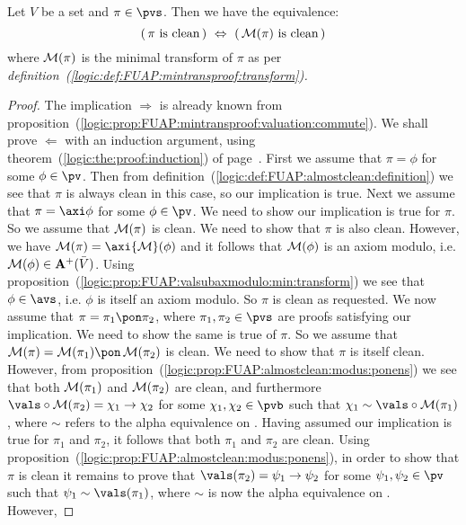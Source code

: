 \begin{prop}\label{logic:prop:FUAP:proofwithcleanMT:mintrans:clean:equivalence}
Let $V$ be a set and $\pi\in\pvs$. Then we have the equivalence:
    \[
    (\,\mbox{$\pi$ is clean}\,)\ \Leftrightarrow\ (\,\mbox{${\cal M}(\pi)$ is clean}\,)
    \]
where ${\cal M}(\pi)$ is the minimal transform of $\pi$ as per {\em
definition~(\ref{logic:def:FUAP:mintransproof:transform}).}
\end{prop}
\begin{proof}
The implication $\Rightarrow$ is already known from
proposition~(\ref{logic:prop:FUAP:mintransproof:valuation:commute}).
We shall prove $\Leftarrow$ with an induction argument, using
theorem~(\ref{logic:the:proof:induction}) of
page~\pageref{logic:the:proof:induction}. First we assume that
$\pi=\phi$ for some $\phi\in\pv$. Then from
definition~(\ref{logic:def:FUAP:almostclean:definition}) we see that
$\pi$ is always clean in this case, so our implication is true. Next
we assume that $\pi=\axi\phi$ for some $\phi\in\pv$. We need to show
our implication is true for $\pi$. So we assume that ${\cal M}(\pi)$
is clean. We need to show that $\pi$ is also clean. However, we have
${\cal M}(\pi)=\axi{\cal M}(\phi)$ and it follows that ${\cal
M}(\phi)$ is an axiom modulo, i.e. ${\cal M}(\phi)\in{\bf
A}^{+}(\bar{V})$. Using
proposition~(\ref{logic:prop:FUAP:valsubaxmodulo:min:transform}) we
see that $\phi\in\avs$, i.e. $\phi$ is itself an axiom modulo. So
$\pi$ is clean as requested. We now assume that
$\pi=\pi_{1}\pon\pi_{2}$, where $\pi_{1},\pi_{2}\in\pvs$ are proofs
satisfying our implication. We need to show the same is true of
$\pi$. So we assume that ${\cal M}(\pi)={\cal M}(\pi_{1})\pon\,{\cal
M}(\pi_{2})$ is clean. We need to show that $\pi$ is itself clean.
However, from
proposition~(\ref{logic:prop:FUAP:almostclean:modus:ponens}) we see
that both ${\cal M}(\pi_{1})$ and ${\cal M}(\pi_{2})$ are clean, and
furthermore $\vals\circ{\cal M}(\pi_{2})=\chi_{1}\to\chi_{2}$ for
some $\chi_{1},\chi_{2}\in\pvb$ such that
$\chi_{1}\sim\vals\circ{\cal M}(\pi_{1})$, where $\sim$ refers to
the alpha equivalence on \pvb. Having assumed our implication
is true for $\pi_{1}$ and $\pi_{2}$, it follows that both $\pi_{1}$
and $\pi_{2}$ are clean. Using
proposition~(\ref{logic:prop:FUAP:almostclean:modus:ponens}), in
order to show that $\pi$ is clean it remains to prove that
$\vals(\pi_{2})=\psi_{1}\to\psi_{2}$ for some
$\psi_{1},\psi_{2}\in\pv$ such that $\psi_{1}\sim\vals(\pi_{1})$,
where $\sim$ is now the alpha equivalence on \pv. However,

\end{proof}
